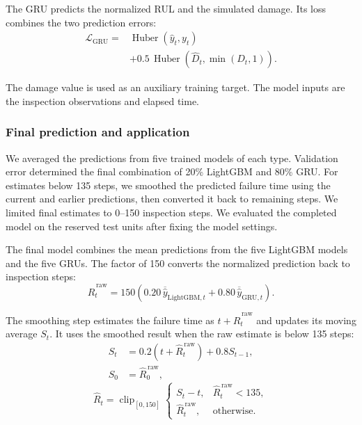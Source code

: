 \documentclass[conference]{IEEEtran}
\begin{document}
The GRU predicts the normalized RUL and the simulated damage. Its loss combines the two prediction errors:
\begin{equation}
\begin{aligned}
\mathcal L_{\mathrm{GRU}}
={}&\operatorname{Huber}(\hat y_t,y_t)\\
&+0.5\,\operatorname{Huber}\!\left(\hat D_t,\min(D_t,1)\right).
\end{aligned}
\end{equation}

The damage value is used as an auxiliary training target. The model inputs are the inspection observations and elapsed time.

\subsubsection{Final prediction and application}

We averaged the predictions from five trained models of each type. Validation error determined the final combination of 20\% LightGBM and 80\% GRU. For estimates below 135 steps, we smoothed the predicted failure time using the current and earlier predictions, then converted it back to remaining steps. We limited final estimates to 0–150 inspection steps. We evaluated the completed model on the reserved test units after fixing the model settings.

The final model combines the mean predictions from the five LightGBM models and the five GRUs. The factor of 150 converts the normalized prediction back to inspection steps:
\begin{equation}
\hat R_t^{\,\mathrm{raw}}
=150\left(0.20\,\overline{\hat y}_{\mathrm{LightGBM},t}
+0.80\,\overline{\hat y}_{\mathrm{GRU},t}\right).
\end{equation}

The smoothing step estimates the failure time as \(t+\hat R_t^{\,\mathrm{raw}}\) and updates its moving average \(S_t\). It uses the smoothed result when the raw estimate is below 135 steps:
\[
\begin{aligned}
S_t &= 0.2\left(t+\hat R_t^{\,\mathrm{raw}}\right)+0.8S_{t-1},\\
S_0 &= \hat R_0^{\,\mathrm{raw}},
\end{aligned}
\]
\begin{equation}
\hat R_t=\operatorname{clip}_{[0,150]}
\begin{cases}
S_t-t, & \hat R_t^{\,\mathrm{raw}}<135,\\
\hat R_t^{\,\mathrm{raw}}, & \text{otherwise}.
\end{cases}
\end{equation}
\end{document}
